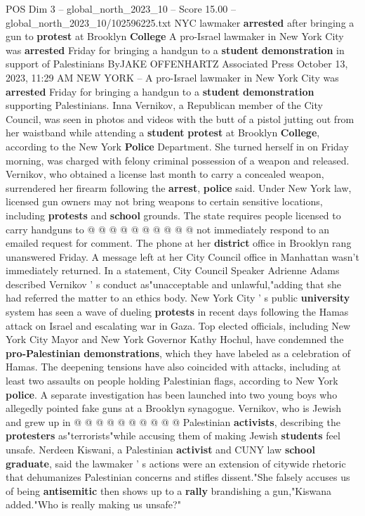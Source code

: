 \begin{textsample}{POS Dim 3 – global\_north\_2023\_10 – Score 15.00 – global\_north\_2023\_10/102596225.txt}  \label{ex:f3_pos_201}
NYC lawmaker \textbf{arrested} after bringing a gun to \textbf{protest} at Brooklyn \textbf{College} A pro-Israel lawmaker in New York City was \textbf{arrested} Friday for bringing a handgun to a \textbf{student} \textbf{demonstration} in support of Palestinians ByJAKE OFFENHARTZ Associated Press October 13, 2023, 11:29 AM NEW YORK -- A pro-Israel lawmaker in New York City was \textbf{arrested} Friday for bringing a handgun to a \textbf{student} \textbf{demonstration} supporting Palestinians.
Inna Vernikov, a Republican member of the City Council, was seen in photos and videos with the butt of a pistol jutting out from her waistband while attending a \textbf{student} \textbf{protest} at Brooklyn \textbf{College}, according to the New York \textbf{Police} Department.
She turned herself in on Friday morning, was charged with felony criminal possession of a weapon and released.
Vernikov, who obtained a license last month to carry a concealed weapon, surrendered her firearm following the \textbf{arrest}, \textbf{police} said.
Under New York law, licensed gun owners may not bring weapons to certain sensitive locations, including \textbf{protests} and \textbf{school} grounds.
The state requires people licensed to carry handguns to @ @ @ @ @ @ @ @ @ @ not immediately respond to an emailed request for comment.
The phone at her \textbf{district} office in Brooklyn rang unanswered Friday.
A message left at her City Council office in Manhattan wasn't immediately returned.
In a statement, City Council Speaker Adrienne Adams described Vernikov ' s conduct as"unacceptable and unlawful,"adding that she had referred the matter to an ethics body.
New York City ' s public \textbf{university} system has seen a wave of dueling \textbf{protests} in recent days following the Hamas attack on Israel and escalating war in Gaza.
Top elected officials, including New York City Mayor and New York Governor Kathy Hochul, have condemned the \textbf{pro-Palestinian} \textbf{demonstrations}, which they have labeled as a celebration of Hamas.
The deepening tensions have also coincided with attacks, including at least two assaults on people holding Palestinian flags, according to New York \textbf{police}.
A separate investigation has been launched into two young boys who allegedly pointed fake guns at a Brooklyn synagogue.
Vernikov, who is Jewish and grew up in @ @ @ @ @ @ @ @ @ @ Palestinian \textbf{activists}, describing the \textbf{protesters} as"terrorists"while accusing them of making Jewish \textbf{students} feel unsafe.
Nerdeen Kiswani, a Palestinian \textbf{activist} and CUNY law \textbf{school} \textbf{graduate}, said the lawmaker ' s actions were an extension of citywide rhetoric that dehumanizes Palestinian concerns and stifles dissent."She falsely accuses us of being \textbf{antisemitic} then shows up to a \textbf{rally} brandishing a gun,"Kiswana added."Who is really making us unsafe?"

\end{textsample}
